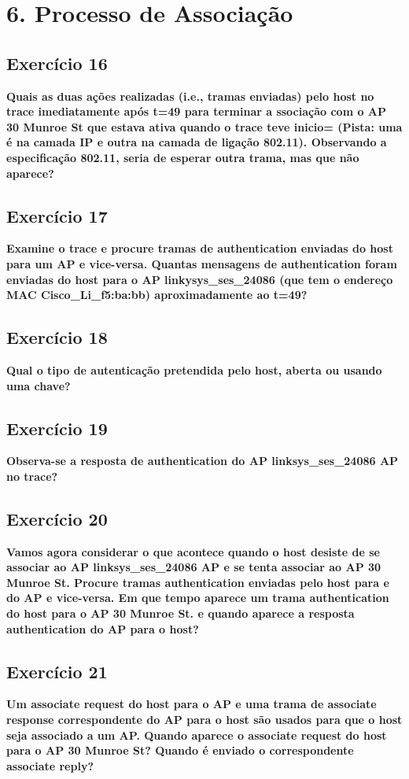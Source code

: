 \documentclass[a4paper]{report}
\begin{document}
\chapter{6. Processo de Associação}
\section{Exercício 16}
\textbf{Quais as duas ações realizadas (i.e., tramas enviadas) pelo host no
    trace imediatamente após t=49 para terminar a ssociação com o AP 30 Munroe
    St que estava ativa quando o trace teve inicio= (Pista: uma é na camada IP e
    outra na camada de ligação 802.11). Observando a especificação 802.11, seria
    de esperar outra trama, mas que não aparece?}

\section{Exercício 17}
\textbf{Examine o trace e procure tramas de authentication enviadas do host para
    um AP e vice-versa. Quantas mensagens de authentication foram enviadas do
    host para o AP linkysys\_ses\_24086 (que tem o endereço MAC
    Cisco\_Li\_f5:ba:bb) aproximadamente ao t=49?}

\section{Exercício 18}
\textbf{Qual o tipo de autenticação pretendida pelo host, aberta ou usando uma
    chave?}

\section{Exercício 19}
\textbf{Observa-se a resposta de authentication do AP linksys\_ses\_24086 AP no
    trace?}

\section{Exercício 20}
\textbf{Vamos agora considerar o que acontece quando o host desiste de se
    associar ao AP linksys\_ses\_24086 AP e se tenta associar ao AP 30 Munroe
    St. Procure tramas authentication enviadas pelo host para e do AP e
    vice-versa. Em que tempo aparece um trama authentication do host para o AP
    30 Munroe St. e quando aparece a resposta authentication do AP para o host?}

\section{Exercício 21}
\textbf{Um associate request do host para o AP e uma trama de associate response
    correspondente do AP para o host são usados para que o host seja associado a
    um AP. Quando aparece o associate request do host para o AP 30 Munroe St?
    Quando é enviado o correspondente associate reply?}
\end{document}
